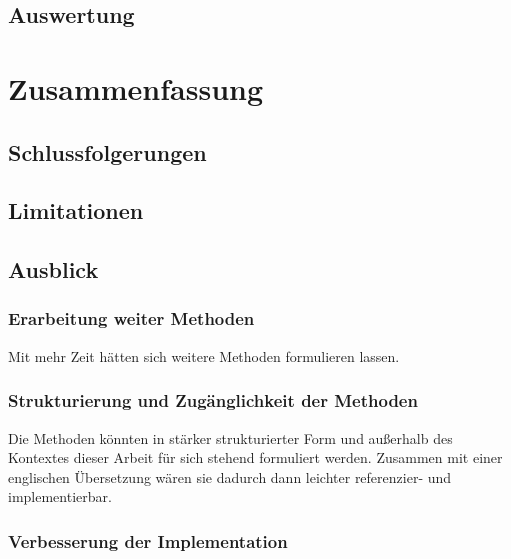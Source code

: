 \documentclass[oneside,bibliography=totocnumbered,BCOR=5mm]{scrbook}
\begin{document}
\section{Auswertung}

\chapter{Zusammenfassung}
\section{Schlussfolgerungen}
\section{Limitationen}
\section{Ausblick}

\subsection{Erarbeitung weiter Methoden}

Mit mehr Zeit hätten sich weitere Methoden formulieren lassen.

\subsection{Strukturierung und Zugänglichkeit der Methoden}

Die Methoden könnten in stärker strukturierter Form und außerhalb des Kontextes
dieser Arbeit für sich stehend formuliert werden. Zusammen mit einer englischen
Übersetzung wären sie dadurch dann leichter referenzier- und implementierbar.

\subsection{Verbesserung der Implementation}
\end{document}
